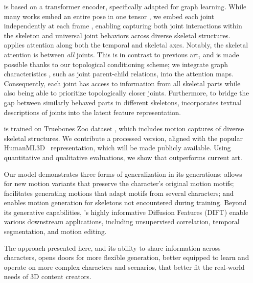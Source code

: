\algoname is based on a transformer encoder, specifically adapted for graph learning. 
While many works embed an entire pose in one tensor \cite{han2024amd,xie2023omnicontrol}, we embed each joint independently at each frame \cite{aberman2020skeleton, agrawal2024skel}, enabling capturing both joint interactions within the skeleton and universal joint behaviors across diverse skeletal structures.
\algoname applies attention along both the temporal and skeletal axes. Notably, the skeletal attention is between \textit{all} joints. This is in contrast to previous art, and is made possible thanks to our topological conditioning scheme; 
we integrate graph characteristics \cite{park2022grpe, ying2021do}, such as joint parent-child relations, into the attention maps.
Consequently, each joint has access to information from all skeletal parts while also being able to prioritize topologically closer joints.
Furthermore, to bridge the gap between similarly behaved parts in different skeletons, \algoname incorporates textual descriptions of joints into the latent feature representation. 

\algoname is trained on Truebones Zoo dataset \cite{truebones}, which includes motion captures of diverse skeletal structures.
We contribute a processed version, aligned with the popular HumanML3D~\cite{guo2022generating} representation, which will be made publicly available. Using quantitative and qualitative evaluations, we show that \algoname outperforms current art.

Our model demonstrates three forms of generalization in its generations: \emph{\Ingen} allows for new motion variants that preserve the character's original motion motifs; \emph{\Crossgen} 
facilitates generating motions that adapt motifs from several characters;
and \emph{\Unseengen} enables motion generation for skeletons not encountered during training.
Beyond its generative capabilities, \algoname's highly informative Diffusion Features (DIFT) \cite{tang2023emergent} 
enable
various downstream applications, including unsupervised correlation, temporal segmentation, and motion editing.

The approach presented here, and its ability to share information across characters, opens doors for 
more flexible generation, better equipped to learn and operate on more complex characters and scenarios, 
that better fit the real-world needs of 3D content creators.





